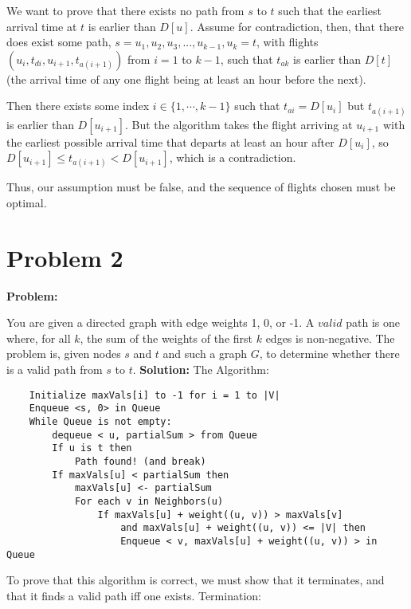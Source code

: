 \documentclass[11pt]{article}
\begin{document}
We want to prove that there exists no path from $s$ to $t$ such that the earliest arrival time at $t$ is earlier than $D[u]$. Assume for contradiction, then, that there does exist some path, $s = u_{1}, u_{2}, u_{3}, ... , u_{k-1}, u_{k} = t$, with flights $(u_{i},t_{di},u_{i+1},t_{a(i+1)})$ from $i = 1$ to $k-1$,  such that $t_{ak}$ is earlier than  $D[t]$ (the arrival time of any one flight being at least an hour before the next).

Then there exists some index $i \in \{1, \dotsb ,k-1\}$ such that
$t_{ai} = D[u_{i}]$ but $t_{a(i+1)}$ is earlier than $D[u_{i+1}]$. But the algorithm takes the flight arriving at $u_{i+1}$ with the earliest possible arrival time that departs at least an hour after $D[u_{i}]$, so $D[u_{i+1}] \leq t_{a(i+1)} < D[u_{i+1}]$, which is a contradiction.

Thus, our assumption must be false, and the sequence of flights chosen must be optimal.



\section*{Problem 2}
{\bf Problem:}

You are given a directed graph with edge weights 1, 0, or -1. A $valid$ path is one where, for all $k$, the sum of the weights of the first $k$ edges is non-negative. The problem is, given nodes $s$ and $t$ and such a graph $G$, to determine whether there is a valid path from $s$ to $t$. \newline \newline
{\bf Solution:} \newline \newline
The Algorithm:

\begin{verbatim}
    Initialize maxVals[i] to -1 for i = 1 to |V|
    Enqueue <s, 0> in Queue
    While Queue is not empty:
        dequeue < u, partialSum > from Queue
        If u is t then
            Path found! (and break)
        If maxVals[u] < partialSum then
            maxVals[u] <- partialSum
            For each v in Neighbors(u)
                If maxVals[u] + weight((u, v)) > maxVals[v]
                    and maxVals[u] + weight((u, v)) <= |V| then
                    Enqueue < v, maxVals[u] + weight((u, v)) > in Queue
\end{verbatim}

To prove that this algorithm is correct, we must show that it terminates, and that it finds a valid path iff one exists. \newline \newline
Termination: \newline
\end{document}
